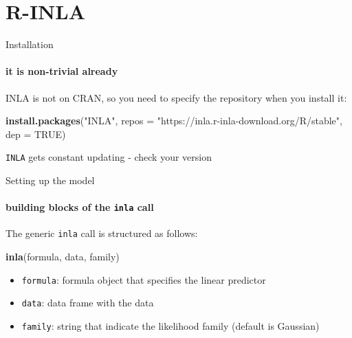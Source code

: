 \documentclass[9pt,ignorenonframetext,]{beamer}
\newenvironment{Shaded}{\begin{snugshade}}{\end{snugshade}}
\newcommand{\DataTypeTok}[1]{\textcolor[rgb]{0.13,0.29,0.53}{#1}}
\newcommand{\KeywordTok}[1]{\textcolor[rgb]{0.13,0.29,0.53}{\textbf{#1}}}
\newcommand{\NormalTok}[1]{#1}
\newcommand{\OtherTok}[1]{\textcolor[rgb]{0.56,0.35,0.01}{#1}}
\newcommand{\StringTok}[1]{\textcolor[rgb]{0.31,0.60,0.02}{#1}}
\begin{document}
\hypertarget{r-inla}{%
\section{R-INLA}\label{r-inla}}

\begin{frame}[fragile]{Installation}
\protect\hypertarget{installation}{}

\framesubtitle{it is non-trivial already}

INLA is not on CRAN, so you need to specify the repository when you
install it:

\vspace{0.75cm}

\begin{Shaded}
\begin{Highlighting}[]
\KeywordTok{install.packages}\NormalTok{(}\StringTok{"INLA"}\NormalTok{, }
                 \DataTypeTok{repos =} \StringTok{"https://inla.r-inla-download.org/R/stable"}\NormalTok{, }
                 \DataTypeTok{dep =} \OtherTok{TRUE}\NormalTok{)}
\end{Highlighting}
\end{Shaded}

\vspace{0.25cm}

\texttt{INLA} gets constant updating - check your version

\end{frame}

\begin{frame}[fragile]{Setting up the model}
\protect\hypertarget{setting-up-the-model}{}

\framesubtitle{building blocks of the \texttt{inla} call}

The generic \texttt{inla} call is structured as follows:

\begin{Shaded}
\begin{Highlighting}[]
\KeywordTok{inla}\NormalTok{(formula, data, family)}
\end{Highlighting}
\end{Shaded}

\vspace{0.25cm}

\begin{itemize}
\item
  \texttt{formula}: formula object that specifies the linear predictor
\item
  \texttt{data}: data frame with the data
\item
  \texttt{family}: string that indicate the likelihood family (default
  is Gaussian)
\end{itemize}

\end{frame}
\end{document}
